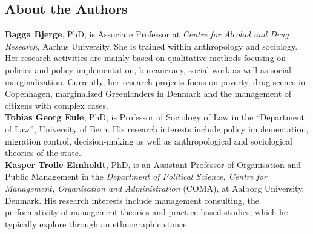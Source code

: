 \subsection{About the Authors}
\label{paper1:colophon}

\textbf{Bagga Bjerge}, PhD, is Associate Professor at \textit{Centre for Alcohol and Drug Research}, Aarhus University. She is trained within anthropology and sociology. Her research activities are mainly based on qualitative methods focusing on policies and policy implementation, bureaucracy, social work as well as social marginalization. Currently, her research projects focus on poverty, drug scenes in Copenhagen, marginalized Greenlanders in Denmark and the management of citizens with complex cases.
\\
\textbf{Tobias Georg Eule}, PhD, is Professor of Sociology of Law in the \enquote{Department of Law}, University of Bern. His research interests include policy implementation, migration control, decision-making as well as anthropological and sociological theories of the state.
\\
\textbf{Kasper Trolle Elmholdt}, PhD, is an Assistant Professor of Organisation and Public Management in the \textit{Department of Political Science, Centre for Management, Organisation and Administration} (COMA), at Aalborg University, Denmark. His research interests include management consulting, the performativity of management theories and practice-based studies, which he typically explore through an ethnographic stance. 